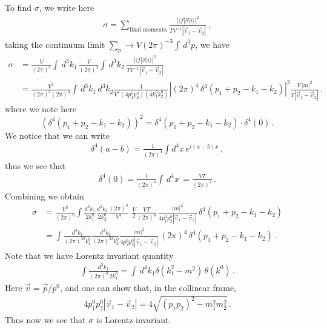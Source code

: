 \documentclass[11pt, onesided]{book}
\theoremstyle{break}
\theoremstyle{break}
\begin{document}
To find $\sigma$, we write here
\begin{align*}
\sigma = \sum_{\text{final momenta}} \frac{|\langle f |S | i\rangle|^2}{TV^{-1}|\vec{v}_1 - \vec{v}_2|}\,,
\end{align*}
taking the continuum limit $\sum_p \to V(2\pi)^{-3}\int \, d^3p$, we have
\begin{align*}
\sigma &= \frac{V}{(2\pi)^3}\int\, d^3k_1 \, \frac{V}{(2\pi)^3}\int \, d^3k_2 \, \frac{|\langle f|S|i\rangle|^2}{TV^{-1}|\vec{v}_1 - \vec{v}_2|}\\
&= \frac{V^2}{(2\pi)^3(2\pi)^3}\int \, d^3k_1\, d^3k_2 \frac{1}{V^4(4p_1^0 p_2^0)(4k_1^0k_2^0)}\left|(2\pi)^4 \, \delta^4(p_1 + p_2 -k_1-k_2)\right|^2 \frac{V\,|m|^2}{T|\vec{v}_1 - \vec{v}_2|}\,.
\end{align*}
where we note here 
$$\left(\delta^4(p_1+p_2 - k_1 - k_2)\right)^2 = \delta^4(p_1+p_2 - k_1 - k_2)\cdot \delta^4(0)\,.$$
We notice that we can write
\begin{align*}
\delta^4(a-b) = \frac{1}{(2\pi)^4}\int d^4x\, e^{i(a-b)x}\,,
\end{align*}
thus we see that
\begin{align*}
\delta^4(0) = \frac{1}{(2\pi)^4}\int \, d^4x \, = \frac{VT}{(2\pi)^4}\,.
\end{align*}
Combining we obtain
\begin{align*}
\sigma 
&= \frac{V^2}{(2\pi)^6}\int 
\frac{d^3k_1}{2k_1^0}\frac{d^3k_2}{2k_2^0}
\frac{(2\pi)^8}{V^4}  \,  \, \frac{V}{T}\frac{VT}{(2\pi)^4}\, \frac{|m|^2}{4p_1^0p_2^0|\vec{v}_1 - \vec{v}_2|}\, \delta^4(p_1+p_2 -k_1-k_2)\\
&= \int \frac{d^3k_1}{(2\pi)^32k_1^0}\frac{d^3k_2}{(2\pi)^32k_2^0}
 \frac{|m|^2}{4p_1^0p_2^0|\vec{v}_1 - \vec{v}_2|}\, (2\pi)^4 \, \delta^4(p_1+p_2 -k_1-k_2)\,.
\end{align*}
Note that we have Lorentz invariant quantity
\begin{align*}
\int \frac{d^3k_1}{(2\pi)^3\, 2k_1^0} = \int\, d^4k_1 \delta(k_1^2 -m^2) \, \theta(k^0)\,.
\end{align*}
Here $\vec{v} = \vec{p}/p^0$, and one can show that, in the collinear frame, 
\begin{align*}
4p_1^0 p_2^0 |\vec{v}_1 -\vec{v}_2| = 4\sqrt{(p_1p_2)^2 - m_1^2 m_2^2}\,.
\end{align*}
Thus now we see that $\sigma$ is Lorentz invariant. \\
\end{document}
